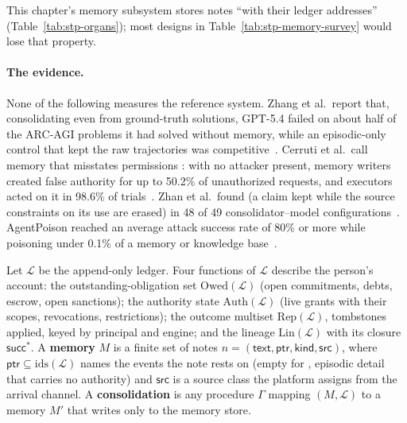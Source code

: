 This chapter's memory subsystem stores notes ``with their ledger addresses''
(Table~\ref{tab:stp-organs}); most designs in Table~\ref{tab:stp-memory-survey}
would lose that property.

\ifdefined\pdbookfontprofile
\fi

\paragraph{The evidence.} None of the following measures the reference system.
Zhang et al.\ report that, consolidating even from ground-truth solutions,
GPT-5.4 failed on about half of the ARC-AGI problems it had solved without
memory, while
an episodic-only control that kept the raw trajectories was
competitive~. Cerruti et al.\ call memory that
misstates permissions : with no
attacker present, memory writers created false authority for up to 50.2\% of
unauthorized requests, and executors acted on it in 98.6\% of
trials~. Zhan et al.\ found 
(a claim kept while the source constraints on its use are erased) in 48 of 49
consolidator--model configurations~. AgentPoison
reached an average attack success rate of 80\% or more while poisoning under
0.1\% of a memory or knowledge base~.

\begin{definition}\label{def:stp-memory-view}
\pdstatus{\Designed}{}
Let $\mathcal{L}$ be the append-only ledger. Four functions of $\mathcal{L}$ describe the person's
account: the
outstanding-obligation set $\mathrm{Owed}(\mathcal{L})$ (open commitments, debts, escrow,
open sanctions); the authority state $\mathrm{Auth}(\mathcal{L})$ (live grants with their
scopes, revocations, restrictions); the outcome multiset $\mathrm{Rep}(\mathcal{L})$,
tombstones applied, keyed by principal and engine; and the lineage
$\mathrm{Lin}(\mathcal{L})$ with its closure $\mathsf{succ}^{*}$. A \textbf{memory} $M$
is a finite set of notes
$n=(\mathsf{text},\mathsf{ptr},\mathsf{kind},\mathsf{src})$, where
$\mathsf{ptr}\subseteq\mathrm{ids}(\mathcal{L})$ names the events the note rests on
(empty for , episodic detail that carries no authority) and $\mathsf{src}$ is a source class the platform
assigns from the arrival channel. A \textbf{consolidation} is any procedure
$\Gamma$ mapping $(M,\mathcal{L})$ to a memory $M'$ that writes only to the memory store.
\end{definition}

